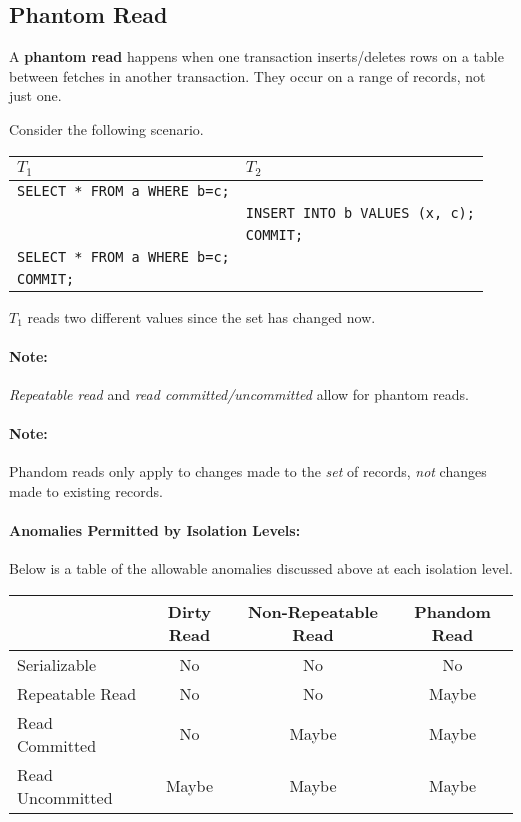 \documentclass{report}
\newenvironment{definition}[1]{\begin{tcolorbox}[title={Definition: #1}]}{\end{tcolorbox}}
\newenvironment{example}{\begin{tcolorbox}[title={Example},colback=green!5!white,colframe=black!75!green]}{\end{tcolorbox}}
\renewcommand{\bf}[1]{\textbf{{#1}}}
\renewcommand{\tt}[1]{\texttt{{#1}}}
\renewcommand{\it}[1]{\textit{{#1}}}
\begin{document}
\subsection{Phantom Read}
\begin{definition}{Phantom Read}
    A \bf{phantom read} happens when one transaction inserts/deletes rows on a
    table between fetches in another transaction. They occur on a range of
    records, not just one.
\end{definition}

\begin{example}
    Consider the following scenario.

    {
        \centering
        \begin{tabular}{l|l}
            $T_1$ & $T_2$ \\
            \hline
            \tt{SELECT * FROM a WHERE b=c;} & \\
                            & \tt{INSERT INTO b VALUES (x, c);} \\
                            & \tt{COMMIT;} \\
            \tt{SELECT * FROM a WHERE b=c;} & \\
            \tt{COMMIT;} & \\
        \end{tabular}
        \par
    }

    $T_1$ reads two different values since the set has changed now.
\end{example}
\paragraph{Note:} \it{Repeatable read} and \it{read committed/uncommitted} allow
for phantom reads.

\paragraph{Note:} Phandom reads only apply to changes made to the \it{set} of
records, \it{not} changes made to existing records.

\paragraph{Anomalies Permitted by Isolation Levels:} Below is a table of the
allowable anomalies discussed above at each isolation level.

{
    \centering
    \begin{tabular}{l|c|c|c}
        & Dirty Read & Non-Repeatable Read & Phandom Read \\
        \hline
        Serializable & No & No & No \\
        Repeatable Read & No & No & Maybe \\
        Read Committed & No & Maybe & Maybe \\
        Read Uncommitted & Maybe & Maybe & Maybe \\
    \end{tabular}
    \par
}
\end{document}
